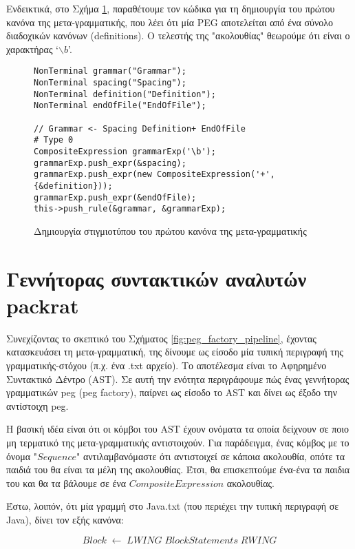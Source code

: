 Ενδεικτικά, στο Σχήμα \ref{fig:meta_example}, παραθέτουμε τον κώδικα για τη δημιουργία του πρώτου κανόνα της μετα-γραμματικής, που λέει ότι μία PEG αποτελείται από ένα σύνολο διαδοχικών κανόνων (definitions). O τελεστής της "ακολουθίας" θεωρούμε ότι είναι ο χαρακτήρας `$\backslash b$'. 

\begin{figure}[h]
\setlength\partopsep{-\topsep}%
\begin{verbatim}
NonTerminal grammar("Grammar");
NonTerminal spacing("Spacing");
NonTerminal definition("Definition");
NonTerminal endOfFile("EndOfFile");

// Grammar <- Spacing Definition+ EndOfFile                     # Type 0
CompositeExpression grammarExp('\b');
grammarExp.push_expr(&spacing);
grammarExp.push_expr(new CompositeExpression('+', {&definition}));
grammarExp.push_expr(&endOfFile);
this->push_rule(&grammar, &grammarExp);
\end{verbatim}
\caption{Δημιουργία στιγμιοτύπου του πρώτου κανόνα της μετα-γραμματικής}
\label{fig:meta_example}
\end{figure}

\section{Γεννήτορας συντακτικών αναλυτών packrat}

Συνεχίζοντας το σκεπτικό του Σχήματος \ref{fig:peg_factory_pipeline}, έχοντας κατασκευάσει τη μετα-γραμματική, της δίνουμε ως είσοδο μία τυπική περιγραφή της γραμματικής-στόχου (π.χ. ένα .txt αρχείο). 
Το αποτέλεσμα είναι το Αφηρημένο Συντακτικό Δέντρο (AST). 
Σε αυτή την ενότητα περιγράφουμε πώς ένας γεννήτορας γραμματικών peg (peg factory), παίρνει ως είσοδο το AST και δίνει ως έξοδο την αντίστοιχη peg.

Η βασική ιδέα είναι ότι οι κόμβοι του AST έχουν ονόματα τα οποία δείχνουν σε ποιο μη τερματικό της μετα-γραμματικής αντιστοιχούν.
Για παράδειγμα, ένας κόμβος με το όνομα "$Sequence$" αντιλαμβανόμαστε ότι αντιστοιχεί σε κάποια ακολουθία, οπότε τα παιδιά του θα είναι τα μέλη της ακολουθίας.
Έτσι, θα επισκεπτούμε ένα-ένα τα παιδια του και θα τα βάλουμε σε ένα $CompositeExpression$ ακολουθίας.

Έστω, λοιπόν, ότι μία γραμμή στο Java.txt (που περιέχει την τυπική περιγραφή σε Java), δίνει τον εξής κανόνα:

\begin{equation}
	Block \; \leftarrow \; LWING \; BlockStatements \; RWING
\end{equation}

